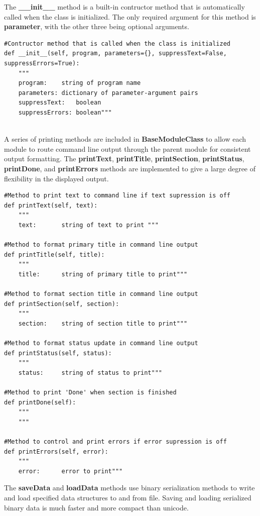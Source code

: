 The \textbf{\_\_init\_\_} method is a built-in contructor method that is automatically called when the class is initialized. The only required argument for this method is \textbf{parameter}, with the other three being optional arguments. 

\begin{lstlisting}[frame=single]
#Contructor method that is called when the class is initialized
def __init__(self, program, parameters={}, suppressText=False, suppressErrors=True):
	"""
	program:	string of program name
	parameters:	dictionary of parameter-argument pairs
	suppressText:	boolean
	suppressErrors:	boolean"""
	
\end{lstlisting}

A series of printing methods are included in \textbf{BaseModuleClass} to allow each module to route command line output through the parent module for consistent output formatting. The \textbf{printText}, \textbf{printTitle}, \textbf{printSection}, \textbf{printStatus}, \textbf{printDone}, and \textbf{printErrors} methods are implemented to give a large degree of flexibility in the displayed output.

\begin{lstlisting}[frame=single]
#Method to print text to command line if text supression is off
def printText(self, text):
	"""
	text:		string of text to print """
	
#Method to format primary title in command line output 
def printTitle(self, title):
	"""
	title:		string of primary title to print"""
	
#Method to format section title in command line output 
def printSection(self, section):
	"""
	section:	string of section title to print"""
	
#Method to format status update in command line output 
def printStatus(self, status):
	"""
	status:		string of status to print"""
	
#Method to print 'Done' when section is finished 
def printDone(self):
	"""	
	"""
	
#Method to control and print errors if error supression is off
def printErrors(self, error):
	"""
	error:		error to print"""
\end{lstlisting}

The \textbf{saveData} and \textbf{loadData} methods use binary serialization methods to write and load specified data structures to and from file. Saving and loading serialized binary data is much faster and more compact than unicode.


